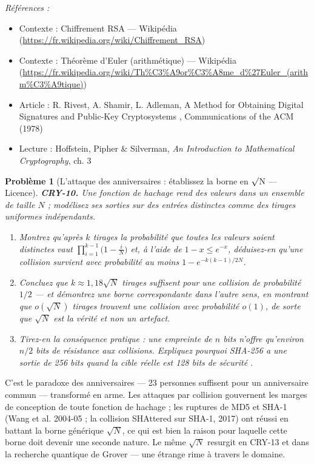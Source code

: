 \documentclass[11pt]{article}
\newtheorem{problem}{Problème}
\newenvironment{refs}{\par\small\noindent\emph{Références :}\begin{itemize}\setlength\itemsep{0pt}}{\end{itemize}\normalsize}
\begin{document}
\begin{refs}
\item Contexte : Chiffrement RSA --- Wikipédia (\url{https://fr.wikipedia.org/wiki/Chiffrement_RSA})
\item Contexte : Théorème d'Euler (arithmétique) --- Wikipédia (\url{https://fr.wikipedia.org/wiki/Th%C3%A9or%C3%A8me_d%27Euler_(arithm%C3%A9tique)})
\item Article : R. Rivest, A. Shamir, L. Adleman, \og{} A Method for Obtaining Digital Signatures and Public-Key Cryptosystems \fg{}, Communications of the ACM (1978)
\item Lecture : Hoffstein, Pipher \& Silverman, \textit{An Introduction to Mathematical Cryptography}, ch. 3
\end{refs}

\bigskip

\begin{problem}[{L'attaque des anniversaires : établissez la borne en $\surd$N --- Licence}]
\textbf{CRY-10.} Une fonction de hachage rend des valeurs dans un ensemble de taille
$N$ ; modélisez ses sorties sur des entrées distinctes comme des tirages uniformes
indépendants.
\begin{enumerate}
\item[(a)] Montrez
qu'après $k$ tirages la probabilité que toutes les valeurs soient distinctes vaut
$\prod_{i=1}^{k-1}\bigl(1 - \frac{i}{N}\bigr)$ et, à l'aide de $1-x \le e^{-x}$,
déduisez-en qu'une collision survient avec probabilité au moins
$1 - e^{-k(k-1)/2N}$.
\item[(b)] Concluez que $k \approx 1{,}18\sqrt{N}$ tirages suffisent
pour une collision de probabilité $1/2$ --- et démontrez une borne correspondante dans
l'autre sens, en montrant que $o(\sqrt N)$ tirages trouvent une collision avec probabilité
$o(1)$, de sorte que $\sqrt N$ est la vérité et non un artefact.
\item[(c)] Tirez-en la
conséquence pratique : une empreinte de $n$ bits n'offre qu'environ $n/2$ bits de
résistance aux collisions. Expliquez pourquoi SHA-256 a une sortie de 256 bits quand la
cible réelle est \og{} 128 bits de sécurité \fg{}.
\end{enumerate}

\end{problem}

\noindent C'est le paradoxe des anniversaires --- 23 personnes suffisent pour un
anniversaire commun --- transformé en arme. Les attaques par collision gouvernent les marges de
conception de toute fonction de hachage ; les ruptures de MD5 et SHA-1 (Wang et al.
2004-05 ; la collision SHAttered sur SHA-1, 2017) ont réussi en battant la borne générique
$\sqrt N$, ce qui est bien la raison pour laquelle cette borne doit devenir une seconde
nature. Le même $\sqrt N$ resurgit en CRY-13 et dans la recherche quantique de Grover --- une
étrange rime à travers le domaine.
\end{document}
